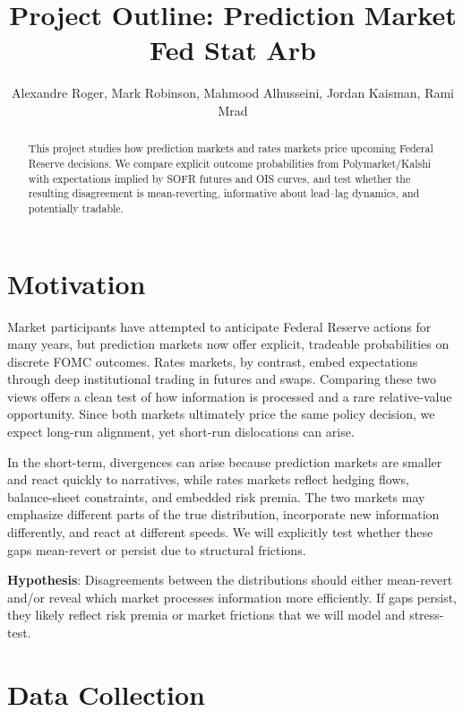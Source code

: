 \documentclass[11pt]{article}
\title{\textbf{Project Outline: Prediction Market Fed Stat Arb}}
\author{Alexandre Roger, Mark Robinson, Mahmood Alhusseini, Jordan Kaisman, Rami Mrad}
\date{}
\begin{document}
\maketitle
\onehalfspacing

\begin{abstract}
This project studies how prediction markets and rates markets price upcoming Federal Reserve decisions. We compare explicit outcome probabilities from Polymarket/Kalshi with expectations implied by SOFR futures and OIS curves, and test whether the resulting disagreement is mean-reverting, informative about lead--lag dynamics, and potentially tradable.
\end{abstract}

\section{Motivation}

Market participants have attempted to anticipate Federal Reserve actions for many years, but prediction markets now offer explicit, tradeable probabilities on discrete FOMC outcomes. Rates markets, by contrast, embed expectations through deep institutional trading in futures and swaps. Comparing these two views offers a clean test of how information is processed and a rare relative-value opportunity. Since both markets ultimately price the same policy decision, we expect long-run alignment, yet short-run dislocations can arise.

In the short-term, divergences can arise because prediction markets are smaller and react quickly to narratives, while rates markets reflect hedging flows, balance-sheet constraints, and embedded risk premia. The two markets may emphasize different parts of the true distribution, incorporate new information differently, and react at different speeds. We will explicitly test whether these gaps mean-revert or persist due to structural frictions.

\begin{center}
    \textbf{Hypothesis}: Disagreements between the distributions should either mean-revert and/or reveal which market processes information more efficiently. If gaps persist, they likely reflect risk premia or market frictions that we will model and stress-test.
\end{center}

\section{Data Collection}
\end{document}
